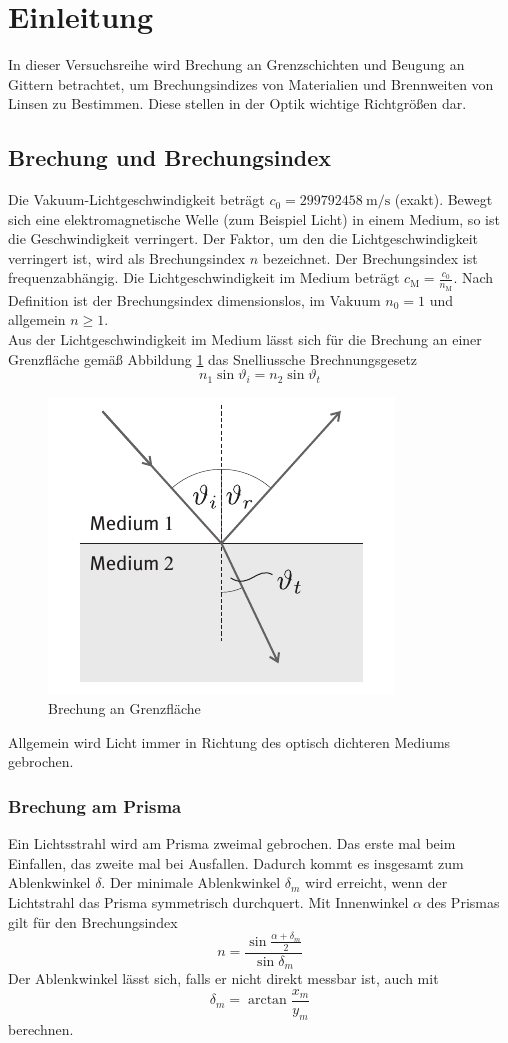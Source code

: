 \section{Einleitung}
In dieser Versuchsreihe wird Brechung an Grenzschichten und Beugung an Gittern betrachtet, um Brechungsindizes von Materialien und Brennweiten von Linsen zu Bestimmen. Diese stellen in der Optik wichtige Richtgrößen dar.
\subsection{Brechung und Brechungsindex}
Die Vakuum-Lichtgeschwindigkeit beträgt $ c_0 = \SI{299 792 458}{\meter\per\second} $ (exakt). Bewegt sich eine elektromagnetische Welle (zum Beispiel Licht) in einem Medium, so ist die Geschwindigkeit verringert. Der Faktor, um den die Lichtgeschwindigkeit verringert ist, wird als Brechungsindex $ n $ bezeichnet. Der Brechungsindex ist frequenzabhängig. Die Lichtgeschwindigkeit im Medium beträgt $ c_\mathrm M = \frac{c_0}{n_\mathrm M} $. Nach Definition ist der Brechungsindex dimensionslos, im Vakuum $ n_0 = 1 $ und allgemein $ n \geq 1 $.\\
Aus der Lichtgeschwindigkeit im Medium lässt sich für die Brechung an einer Grenzfläche gemäß Abbildung \ref{fig:brech} das Snelliussche Brechnungsgesetz
\begin{equation}
	n_1 \sin \vartheta_i = n_2 \sin \vartheta_t \label{eq:snell}
\end{equation}
\begin{figure}[h]
\centering
\includegraphics[width=0.4\linewidth]{./Bilder/Grenzschicht}
\caption{Brechung an Grenzfläche}
\label{fig:brech}
\end{figure}
Allgemein wird Licht immer in Richtung des optisch dichteren Mediums gebrochen.

\subsubsection{Brechung am Prisma}
Ein Lichtsstrahl wird am Prisma zweimal gebrochen. Das erste mal beim Einfallen, das zweite mal bei Ausfallen. Dadurch kommt es insgesamt zum Ablenkwinkel $ \delta $. Der minimale Ablenkwinkel $ \delta_m $ wird erreicht, wenn der Lichtstrahl das Prisma symmetrisch durchquert. Mit Innenwinkel $ \alpha $ des Prismas gilt für den Brechungsindex
\begin{equation}
	n = \frac{\sin \frac{\alpha + \delta_m}{2}}{\sin \delta_m} \label{eq:brech_pris}
\end{equation} 
Der Ablenkwinkel lässt sich, falls er nicht direkt messbar ist, auch mit
\begin{equation}
	\delta_m  = \arctan \frac{x_m}{y_m} \label{eq:delta}
\end{equation}
berechnen.

